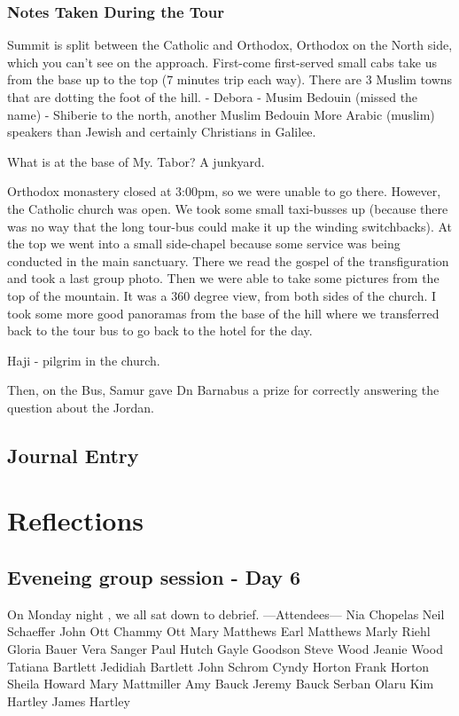 \documentclass[letterpaper]{report}
\begin{document}
\subsection{Notes Taken During the Tour}
Summit is split between the Catholic and Orthodox, Orthodox on the North side, which you can't see on the approach.
First-come first-served small cabs take us from the base up to the top (7 minutes trip each way).
There are 3 Muslim towns that are dotting the foot of the hill.
 - Debora
 - Musim Bedouin (missed the name)
 - Shiberie to the north, another Muslim Bedouin
More Arabic (muslim) speakers than Jewish and certainly Christians in Galilee.

What is at the base of My. Tabor?  A junkyard.

Orthodox monastery closed at 3:00pm, so we were unable to go there. However, the Catholic church was open.
We took some small taxi-busses up (because there was no way that the long tour-bus could make it up the winding switchbacks). At the top we went into a small side-chapel because some service was being conducted in the main sanctuary.  There we read the gospel of the transfiguration and took a last group photo. 
Then we were able to take some pictures from the top of the mountain. It was a 360 degree view, from both sides of the church.
I took some more good panoramas from the base of the hill where we transferred back to the tour bus to go back to the hotel for the day.

Haji - pilgrim in the church.

Then, on the Bus, Samur gave Dn Barnabus a prize for correctly answering the question about the Jordan.

\clearpage
\section{Journal Entry}

\chapter{Reflections}
\section{Eveneing group session - Day 6}
On Monday night , we all sat down to debrief.
---Attendees---
Nia Chopelas
Neil Schaeffer
John Ott
Chammy Ott
Mary Matthews
Earl Matthews
Marly Riehl
Gloria Bauer
Vera Sanger
Paul Hutch
Gayle Goodson
Steve Wood
Jeanie Wood
Tatiana Bartlett
Jedidiah Bartlett
John Schrom
Cyndy Horton
Frank Horton
Sheila Howard
Mary Mattmiller
Amy Bauck
Jeremy Bauck
Serban Olaru
Kim Hartley
James Hartley
\end{document}

